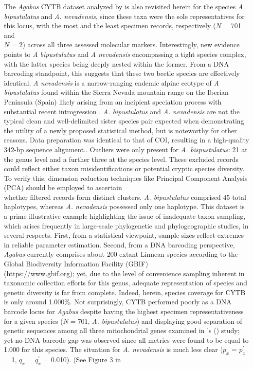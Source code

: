 \documentclass[12pt]{article}
\begin{document}
The \textit{Agabus} CYTB dataset analyzed by \citet{phillips2024measure} is also revisited herein for the species \textit{A. bipustulatus} and \textit{A. nevadensis}, since these taxa were the sole representatives for this locus, with the most and the least specimen records, respectively ($N$ = 701 and \\ $N$ = 2) across all three assessed molecular markers. Interestingly, new evidence \citep{pallares2024genomic} points to \textit{A bipustulatus} and \textit{A nevadensis} encompassing a tight species complex, with the latter species being deeply nested within the former. From a DNA barcoding standpoint, this suggests that these two beetle species are effectively identical. \textit{A nevadensis} is a narrow-ranging endemic alpine ecotype of \textit{A bipustulatus} found within the Sierra Nevada mountain range on the Iberian Peninsula (Spain) likely arising from an incipient speciation process with substantial recent introgression \citep{pallares2024genomic}. \textit{A. bipustulatus} and \textit{A. nevadensis} are not the typical clean and well-delimited sister species pair expected when demonstrating the utility of a newly proposed statistical method, but is noteworthy for other reasons. Data preparation was identical to that of COI, resulting in a high-quality 342-bp sequence alignment.. Outliers were only present for \textit{A. bispustulatus}: 21 at the genus level and a further three at the species level. These excluded records could reflect either taxon misidentifications or potential cryptic species diversity. To verify this, dimension reduction techniques like Principal Component Analysis (PCA) should be employed to ascertain \\ whether filtered records form distinct clusters. \textit{A. bipustulatus} comprised 45 total haplotypes, whereas \textit{A. nevadensis} possessed only one haplotype. This dataset is a prime illustrative example highlighting the issue of inadequate taxon sampling, which arises frequently in large-scale phylogenetic and phylogeographic studies, in several respects. First, from a statistical viewpoint, sample sizes reflect extremes in reliable parameter estimation. Second, from a DNA barcoding perspective, \textit{Agabus} currently comprises about 200 extant Linnean species according to the Global Biodiversity Information Facility (GBIF) \\ (https://www.gbif.org); yet, due to the level of convenience sampling inherent in taxonomic collection efforts for this genus, adequate representation of species and genetic diversity is far from complete. Indeed, herein, species coverage for CYTB is only around 1.000\%. Not surprisingly, CYTB performed poorly as a DNA barcode locus for \textit{Agabus} despite having the highest specimen representativeness for a given species ($N = 701$, \textit{A. bipustulatus}) and displaying good separation of genetic sequences among all three mitochondrial genes examined in \citeauthor{phillips2024measure}'s (\citeyear{phillips2024measure}) study; yet no DNA barcode gap was observed since all metrics were found to be equal to 1.000 for this species. The situation for \textit{A. nevadensis} is much less clear ($p_x$ = $p^{'}_x$ = 1, $q_x$ = $q^{'}_x$ = 0.010). (See Figure 3 in 
\end{document}
